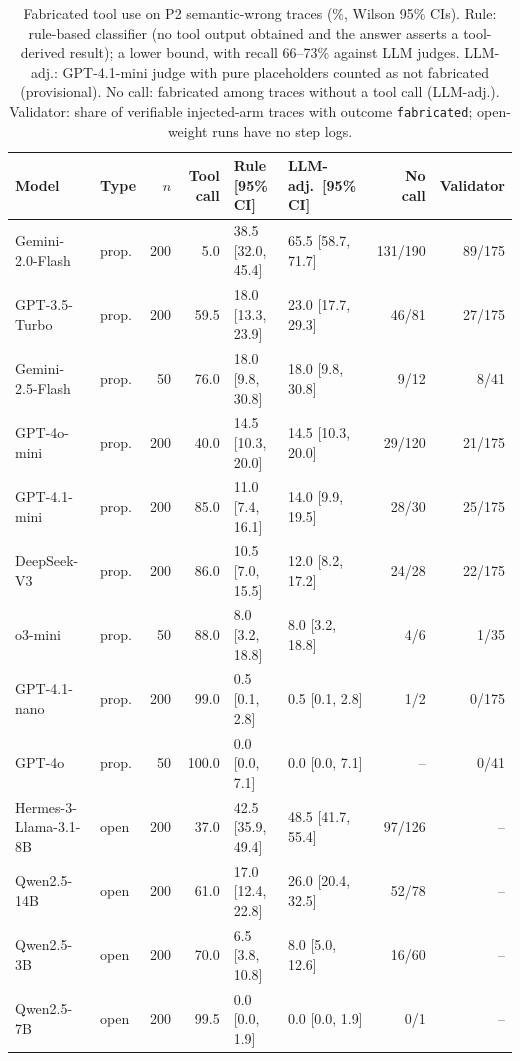 \begin{table}[!tbp]
\centering
\caption{Fabricated tool use on P2 semantic-wrong traces (\%, Wilson 95\% CIs). Rule: rule-based classifier (no tool output obtained and the answer asserts a tool-derived result); a lower bound, with recall 66--73\% against LLM judges. LLM-adj.: GPT-4.1-mini judge with pure placeholders counted as not fabricated (provisional). No call: fabricated among traces without a tool call (LLM-adj.). Validator: share of verifiable injected-arm traces with outcome \texttt{fabricated}; open-weight runs have no step logs.}
\label{tab:fabrication}
\footnotesize
\setlength{\tabcolsep}{3pt}
\begin{tabular}{@{}llrrllrr@{}}
\toprule
Model & Type & $n$ & Tool call & Rule [95\% CI] & LLM-adj.\ [95\% CI] & No call & Validator \\
\midrule
Gemini-2.0-Flash & prop. & 200 & 5.0 & 38.5 [32.0, 45.4] & 65.5 [58.7, 71.7] & 131/190 & 89/175 \\
GPT-3.5-Turbo & prop. & 200 & 59.5 & 18.0 [13.3, 23.9] & 23.0 [17.7, 29.3] & 46/81 & 27/175 \\
Gemini-2.5-Flash & prop. & 50 & 76.0 & 18.0 [9.8, 30.8] & 18.0 [9.8, 30.8] & 9/12 & 8/41 \\
GPT-4o-mini & prop. & 200 & 40.0 & 14.5 [10.3, 20.0] & 14.5 [10.3, 20.0] & 29/120 & 21/175 \\
GPT-4.1-mini & prop. & 200 & 85.0 & 11.0 [7.4, 16.1] & 14.0 [9.9, 19.5] & 28/30 & 25/175 \\
DeepSeek-V3 & prop. & 200 & 86.0 & 10.5 [7.0, 15.5] & 12.0 [8.2, 17.2] & 24/28 & 22/175 \\
o3-mini & prop. & 50 & 88.0 & 8.0 [3.2, 18.8] & 8.0 [3.2, 18.8] & 4/6 & 1/35 \\
GPT-4.1-nano & prop. & 200 & 99.0 & 0.5 [0.1, 2.8] & 0.5 [0.1, 2.8] & 1/2 & 0/175 \\
GPT-4o & prop. & 50 & 100.0 & 0.0 [0.0, 7.1] & 0.0 [0.0, 7.1] & -- & 0/41 \\
\midrule
Hermes-3-Llama-3.1-8B & open & 200 & 37.0 & 42.5 [35.9, 49.4] & 48.5 [41.7, 55.4] & 97/126 & -- \\
Qwen2.5-14B & open & 200 & 61.0 & 17.0 [12.4, 22.8] & 26.0 [20.4, 32.5] & 52/78 & -- \\
Qwen2.5-3B & open & 200 & 70.0 & 6.5 [3.8, 10.8] & 8.0 [5.0, 12.6] & 16/60 & -- \\
Qwen2.5-7B & open & 200 & 99.5 & 0.0 [0.0, 1.9] & 0.0 [0.0, 1.9] & 0/1 & -- \\
\bottomrule
\end{tabular}
\end{table}
